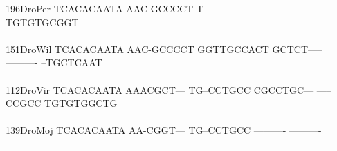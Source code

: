\documentclass[11pt,twoside,reqno,a4paper]{article}
\begin{document}
{196\hspace*{1\charwidth}DroPer	TCACACAATA	AAC-GCCCCT	T---------	----------	----------	TGTGTGCGGT	\\
\hspace*{4\charwidth}\hspace*{7\charwidth}\hspace*{1\charwidth}\hspace*{1\charwidth}\hspace*{1\charwidth}\hspace*{1\charwidth}\hspace*{1\charwidth}\hspace*{1\charwidth}\\
151\hspace*{1\charwidth}DroWil	TCACACAATA	AAC-GCCCCT	GGTTGCCACT	GCTCT-----	----------	--TGCTCAAT	\\
\hspace*{4\charwidth}\hspace*{7\charwidth}\hspace*{1\charwidth}\hspace*{1\charwidth}\hspace*{1\charwidth}\hspace*{1\charwidth}\hspace*{1\charwidth}\hspace*{1\charwidth}\\
112\hspace*{1\charwidth}DroVir	TCACACAATA	AAACGCT---	TG--CCTGCC	CGCCTGC---	-----CCGCC	TGTGTGGCTG	\\
\hspace*{4\charwidth}\hspace*{7\charwidth}\hspace*{1\charwidth}\hspace*{1\charwidth}\hspace*{1\charwidth}\hspace*{1\charwidth}\hspace*{1\charwidth}\hspace*{1\charwidth}\\
139\hspace*{1\charwidth}DroMoj	TCACACAATA	AA-CGGT---	TG--CCTGCC	----------	----------	----------	\\
\hspace*{4\charwidth}\hspace*{7\charwidth}\hspace*{1\charwidth}\hspace*{1\charwidth}\hspace*{1\charwidth}\hspace*{1\charwidth}\hspace*{1\charwidth}\hspace*{1\charwidth}\\
}
\end{document}
